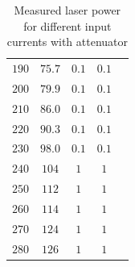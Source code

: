 \documentclass{protokoll_en}
\begin{document}
\begin{appendix}
\begin{table}[H]
{\begin{tabular}{lcccc}
$190$ & $75.7$ & $0.1$ & $0.1$\\
$200$ & $79.9$ & $0.1$ & $0.1$\\
$210$ & $86.0$ & $0.1$ & $0.1$\\
$220$ & $90.3$ & $0.1$ & $0.1$\\
$230$ & $98.0$ & $0.1$ & $0.1$\\
$240$ & $104$ & $1$ & $1$\\
$250$ & $112$ & $1$ & $1$\\
$260$ & $114$ & $1$ & $1$\\
$270$ & $124$ & $1$ & $1$\\
$280$ & $126$ & $1$ & $1$\\
    \bottomrule
  \end{tabular}
}
\caption{Measured laser power for different input currents with attenuator}
  \label{tab:ana_laserpower_att}
\end{table}
\begin{table}[H]
  \centering
{}
\caption{Measured laser power for different input currents without attenuator}
  \label{tab:ana_laserpower_woatt}
\end{table}


\end{appendix}
\end{document}
